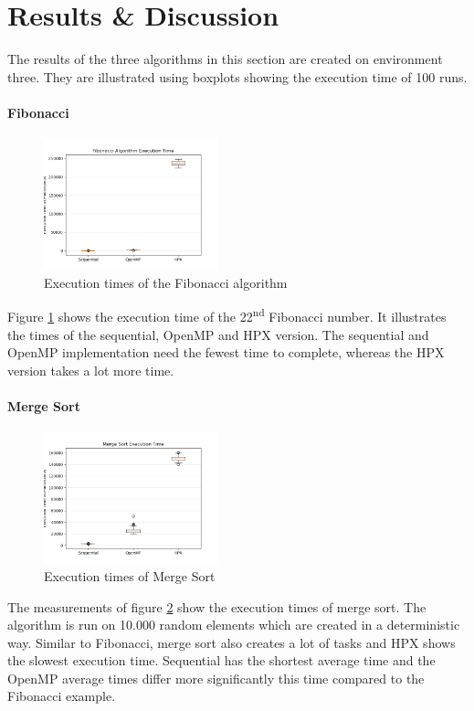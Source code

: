 \section{Results \& Discussion}

The results of the three algorithms in this section are created on environment three.
They are illustrated using boxplots showing the execution time of 100 runs.


\paragraph{Fibonacci}
\begin{figure}[htbp]
	\centering
	\includegraphics[width=0.45\textwidth]{figures/fib_NoOp.png}
	\caption{Execution times of the Fibonacci algorithm}
	\label{fig:fib_NoOp}
\end{figure}

Figure \ref{fig:fib_NoOp} shows the execution time of the 22\textsuperscript{nd} Fibonacci number.
It illustrates the times of the sequential, OpenMP and HPX version.
The sequential and OpenMP implementation need the fewest time to complete, whereas the HPX version takes a lot more time.

\paragraph{Merge Sort}
  \begin{figure}[htbp]
	\centering
	\includegraphics[width=0.45\textwidth]{figures/sort_NoOp.png}
	\caption{Execution times of Merge Sort}
	\label{fig:sort_NoOp}
  \end{figure}
  The measurements of figure \ref{fig:sort_NoOp} show the execution times of merge sort.
  The algorithm is run on 10.000 random elements which are created in a deterministic way.
  Similar to Fibonacci, merge sort also creates a lot of tasks and HPX shows the slowest execution time.
  Sequential has the shortest average time and the OpenMP average times differ more significantly this time compared to the Fibonacci example.
  
